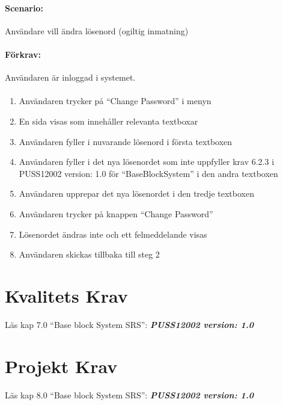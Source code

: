 \documentclass[paper=a4, fontsize=11pt,twoside]{article}
\begin{document}
	\paragraph{Scenario:}Användare vill ändra lösenord (ogiltig inmatning)
	\paragraph{Förkrav:}
	Användaren är inloggad i systemet.
	\paragraph{}
	\begin{enumerate}
		\item  Användaren trycker på “Change Password” i menyn
		\item	 En sida visas som innehåller relevanta textboxar
		\item	Användaren fyller i nuvarande lösenord i första textboxen
		\item	Användaren fyller i det nya lösenordet som inte uppfyller krav 6.2.3 i PUSS12002 version: 1.0 för “BaseBlockSystem” i den andra textboxen
		\item	Användaren upprepar det nya lösenordet i den tredje textboxen
		\item	Användaren trycker på knappen “Change Password”
		\item	Lösenordet ändras inte och ett felmeddelande visas
		\item Användaren skickas tillbaka till steg 2
		
	\end{enumerate}
	
	\section{Kvalitets Krav}
	Läs kap 7.0  “Base block System SRS”:   \textbf{\textit{PUSS12002 version: 1.0}} 
	\section{Projekt Krav}
	Läs kap 8.0  “Base block System SRS”:   \textbf{\textit{PUSS12002 version: 1.0}} 
\end{document}
